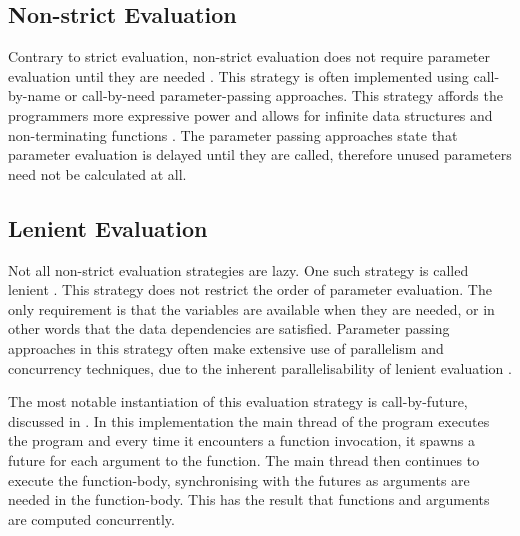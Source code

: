 \subsection{Non-strict Evaluation}
Contrary to strict evaluation, non-strict evaluation does not require parameter evaluation until they are needed \cite{hudak1989conception}. This strategy is often implemented using call-by-name or call-by-need parameter-passing approaches. This strategy affords the programmers more expressive power \cite{bird1997more} and allows for infinite data structures and non-terminating functions \cite[p.~103]{huttel2010transitions}. The parameter passing approaches state that parameter evaluation is delayed until they are called, therefore unused parameters need not be calculated at all.

\subsection{Lenient Evaluation}
Not all non-strict evaluation strategies are lazy. One such strategy is called lenient \cite{DBLP:journals/cl/Tremblay-lenient}. This strategy does not restrict the order of parameter evaluation. The only requirement is that the variables are available when they are needed, or in other words that the data dependencies are satisfied. Parameter passing approaches in this strategy often make extensive use of parallelism and concurrency techniques, due to the inherent parallelisability of lenient evaluation \cite{DBLP:journals/cl/Tremblay-parallel}.

The most notable instantiation of this evaluation strategy is call-by-future, discussed in \cite{baker1977incremental}. In this implementation the main thread of the program executes the program and every time it encounters a function invocation, it spawns a future for each argument to the function. The main thread then continues to execute the function-body, synchronising with the futures as arguments are needed in the function-body. This has the result that functions and arguments are computed concurrently.


